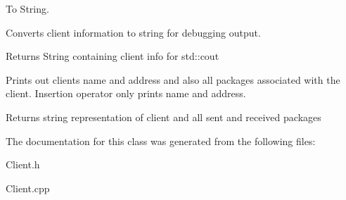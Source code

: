 To String. 

Converts client information to string for debugging output. \begin{DoxyReturn}{Returns}
String containing client info for std\+::cout
\end{DoxyReturn}
Prints out client\textquotesingle{}s name and address and also all packages associated with the client. Insertion operator only prints name and address. \begin{DoxyReturn}{Returns}
string representation of client and all sent and received packages 
\end{DoxyReturn}


The documentation for this class was generated from the following files\+:\begin{DoxyCompactItemize}
\item 
Client.\+h\item 
Client.\+cpp\end{DoxyCompactItemize}

